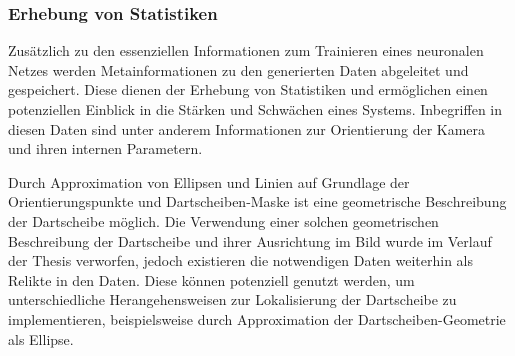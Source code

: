 \subsubsection{Erhebung von Statistiken}

Zusätzlich zu den essenziellen Informationen zum Trainieren eines neuronalen Netzes werden Metainformationen zu den generierten Daten abgeleitet und gespeichert. Diese dienen der Erhebung von Statistiken und ermöglichen einen potenziellen Einblick in die Stärken und Schwächen eines Systems.
Inbegriffen in diesen Daten sind unter anderem Informationen zur Orientierung der Kamera und ihren internen Parametern.

Durch Approximation von Ellipsen und Linien auf Grundlage der Orientierungspunkte und Dartscheiben-Maske ist eine geometrische Beschreibung der Dartscheibe möglich. Die Verwendung einer solchen geometrischen Beschreibung der Dartscheibe und ihrer Ausrichtung im Bild wurde im Verlauf der Thesis verworfen, jedoch existieren die notwendigen Daten weiterhin als Relikte in den Daten. Diese können potenziell genutzt werden, um unterschiedliche Herangehensweisen zur Lokalisierung der Dartscheibe zu implementieren, beispielsweise durch Approximation der Dartscheiben-Geometrie als Ellipse.

